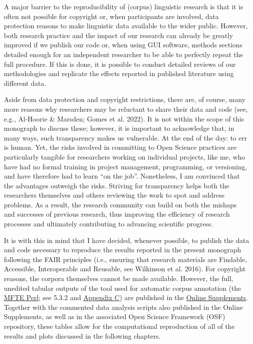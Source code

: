 \documentclass[
  letterpaper,
  DIV=11,
  numbers=noendperiod]{scrreprt}
\begin{document}
A major barrier to the reproducibility of (corpus) linguistic research
is that it is often not possible for copyright or, when participants are
involved, data protection reasons to make linguistic data available to
the wider public. However, both research practice and the impact of our
research can already be greatly improved if we publish our code or, when
using GUI software, methods sections detailed enough for an independent
researcher to be able to perfectly repeat the full procedure. If this is
done, it is possible to conduct detailed reviews of our methodologies
and replicate the effects reported in published literature using
different data.

Aside from data protection and copyright restrictions, there are, of
course, many more reasons why researchers may be reluctant to share
their data and code (see, e.g., Al-Hoorie \& Marsden; Gomes et al.
2022). It is not within the scope of this monograph to discuss these;
however, it is important to acknowledge that, in many ways, such
transparency makes us vulnerable. At the end of the day: to err is
human. Yet, the risks involved in committing to Open Science practices
are particularly tangible for researchers working on individual
projects, like me, who have had no formal training in project
management, programming, or versioning, and have therefore had to learn
``on the job''. Nonetheless, I am convinced that the advantages outweigh
the risks. Striving for transparency helps both the researchers
themselves and others reviewing the work to spot and address problems.
As a result, the research community can build on both the mishaps and
successes of previous research, thus improving the efficiency of
research processes and ultimately contributing to advancing scientific
progress.

It is with this in mind that I have decided, whenever possible, to
publish the data and code necessary to reproduce the results reported in
the present monograph following the FAIR principles (i.e., ensuring that
research materials are Findable, Accessible, Interoperable and Reusable,
see Wilkinson et al. 2016). For copyright reasons, the corpora
themselves cannot be made available. However, the full, unedited tabular
outputs of the tool used for automatic corpus annotation (the
\href{https://github.com/elenlefoll/MultiFeatureTaggerEnglish}{MFTE
Perl}; see 5.3.2 and
\href{https://elenlefoll.github.io/TextbookMDA/AppendixC.html}{Appendix
C}) are published in the
\href{https://elenlefoll.github.io/TextbookMDA}{Online Supplements}.
Together with the commented data analysis scripts also published in the
Online Supplements, as well as in the associated Open Science Framework
(OSF) repository, these tables allow for the computational reproduction
of all of the results and plots discussed in the following chapters.
\end{document}

